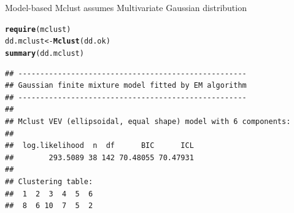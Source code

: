 \documentclass[10pt,xcolor=dvipsnames]{beamer}\usepackage[]{graphicx}\usepackage[]{color}
\makeatletter
\newcommand{\hlnum}[1]{\textcolor[rgb]{0.686,0.059,0.569}{#1}}%
\newcommand{\hlopt}[1]{\textcolor[rgb]{0,0,0}{#1}}%
\newcommand{\hlstd}[1]{\textcolor[rgb]{0.345,0.345,0.345}{#1}}%
\newcommand{\hlkwb}[1]{\textcolor[rgb]{0.69,0.353,0.396}{#1}}%
\newcommand{\hlkwc}[1]{\textcolor[rgb]{0.333,0.667,0.333}{#1}}%
\newcommand{\hlkwd}[1]{\textcolor[rgb]{0.737,0.353,0.396}{\textbf{#1}}}%
\newenvironment{kframe}{%
 \def\at@end@of@kframe{}%
 \ifinner\ifhmode%
  \def\at@end@of@kframe{\end{minipage}}%
  \begin{minipage}{\columnwidth}%
 \fi\fi%
 \def\FrameCommand##1{\hskip\@totalleftmargin \hskip-\fboxsep
 \colorbox{shadecolor}{##1}\hskip-\fboxsep
     \hskip-\linewidth \hskip-\@totalleftmargin \hskip\columnwidth}%
 \MakeFramed {\advance\hsize-\width
   \@totalleftmargin\z@ \linewidth\hsize
   \@setminipage}}%
 {\par\unskip\endMakeFramed%
 \at@end@of@kframe}
\newenvironment{knitrout}{}{} %
\makeatother
\begin{document}
\begin{frame}{Model-based}
Mclust assumes Multivariate Gaussian distribution
\begin{knitrout}\footnotesize
{}\color{fgcolor}\begin{kframe}
\begin{alltt}
\hlkwd{require}\hlstd{(mclust)}
\hlstd{dd.mclust} \hlkwb{<-} \hlkwd{Mclust}\hlstd{(dd.ok)}
\hlkwd{summary}\hlstd{(dd.mclust)}
\end{alltt}
\begin{verbatim}
## ----------------------------------------------------
## Gaussian finite mixture model fitted by EM algorithm 
## ----------------------------------------------------
## 
## Mclust VEV (ellipsoidal, equal shape) model with 6 components:
## 
##  log.likelihood  n  df      BIC      ICL
##        293.5089 38 142 70.48055 70.47931
## 
## Clustering table:
##  1  2  3  4  5  6 
##  8  6 10  7  5  2
\end{verbatim}
\end{kframe}
\end{knitrout}
\end{frame}




\end{document}
